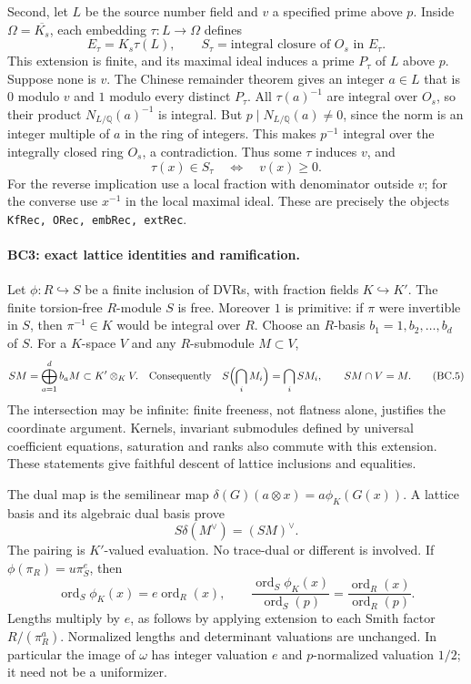 \documentclass[11pt,a4paper]{article}
\numberwithin{equation}{section}
\theoremstyle{remark}\newtheorem{remark}[theorem]{Remark}
\begin{document}
Second, let $L$ be the source number field and $v$ a specified prime
above $p$. Inside $\Omega=\overline{K_s}$, each embedding $\tau:L\to\Omega$
defines
\[
 E_\tau=K_s\tau(L),\qquad
 S_\tau=\text{integral closure of }O_s\text{ in }E_\tau.  \tag{BC.3}
\]
This extension is finite, and its maximal ideal induces a prime
$P_\tau$ of $L$ above $p$. Suppose none is $v$. The Chinese remainder
theorem gives an integer $a\in L$ that is $0$ modulo $v$ and $1$
modulo every distinct $P_\tau$. All $\tau(a)^{-1}$ are integral over
$O_s$, so their product $N_{L/\mathbb Q}(a)^{-1}$ is integral.
But $p\mid N_{L/\mathbb Q}(a)\ne0$, since the norm is an integer
multiple of $a$ in the ring of integers. This makes $p^{-1}$ integral
over the integrally closed ring $O_s$, a contradiction.
Thus some $\tau$ induces $v$, and
\[
 \tau(x)\in S_\tau\quad\Longleftrightarrow\quad v(x)\ge0.
                                                               \tag{BC.4}
\]
For the reverse implication use a local fraction with denominator
outside $v$; for the converse use $x^{-1}$ in the local maximal ideal.
These are precisely the objects \texttt{KfRec, ORec, embRec, extRec}.

\paragraph{BC3: exact lattice identities and ramification.}
Let $\phi:R\hookrightarrow S$ be a finite inclusion of DVRs, with
fraction fields $K\hookrightarrow K'$. The finite torsion-free
$R$-module $S$ is free. Moreover $1$ is primitive: if $\pi$ were
invertible in $S$, then $\pi^{-1}\in K$ would be integral over $R$.
Choose an $R$-basis $b_1=1,b_2,\ldots,b_d$ of $S$. For a
$K$-space $V$ and any $R$-submodule $M\subset V$,
\[
 SM=\bigoplus_{a=1}^d b_aM\subset K'\otimes_KV.
 \quad\text{Consequently}\quad
 S\Bigl(\bigcap_iM_i\Bigr)=\bigcap_iSM_i,
 \qquad SM\cap V=M.                                     \tag{BC.5}
\]
The intersection may be infinite: finite freeness, not flatness alone,
justifies the coordinate argument. Kernels, invariant submodules defined
by universal coefficient equations, saturation and ranks also commute
with this extension. These statements give faithful descent of lattice
inclusions and equalities.

The dual map is the semilinear map
$\delta(G)(a\otimes x)=a\phi_K(G(x))$. A lattice basis and its
algebraic dual basis prove
\[
 S\delta(M^\vee)=(SM)^\vee.                              \tag{BC.6}
\]
The pairing is $K'$-valued evaluation. No trace-dual or different is
involved. If $\phi(\pi_R)=u\pi_S^e$, then
\[
 \operatorname{ord}_S\phi_K(x)=e\operatorname{ord}_R(x),
 \qquad
 \frac{\operatorname{ord}_S\phi_K(x)}{\operatorname{ord}_S(p)}
 =\frac{\operatorname{ord}_R(x)}{\operatorname{ord}_R(p)}.
                                                               \tag{BC.7}
\]
Lengths multiply by $e$, as follows by applying extension to each
Smith factor $R/(\pi_R^a)$. Normalized lengths and determinant
valuations are unchanged. In particular the image of $\omega$ has
integer valuation $e$ and $p$-normalized valuation $1/2$; it need
not be a uniformizer.
\end{document}
